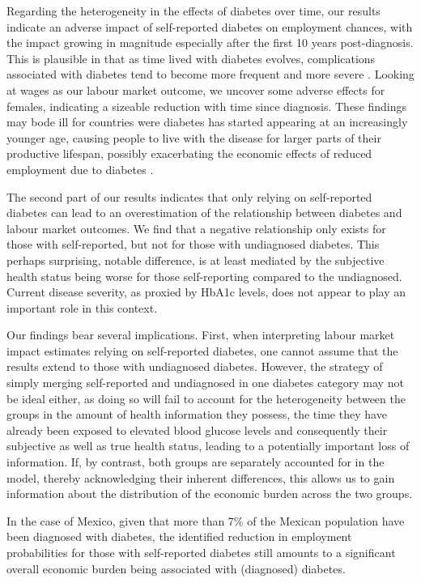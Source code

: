 Regarding the heterogeneity in the effects of diabetes over time, our results indicate an adverse impact of self-reported diabetes on employment chances, with the impact growing in magnitude especially after the first 10 years post-diagnosis. This is plausible in that as time lived with diabetes evolves, complications associated with diabetes tend to become more frequent and more severe \parencite{Adler2003}. Looking at wages as our labour market outcome, we uncover some adverse effects for females, indicating a sizeable reduction with time since diagnosis. These findings may bode ill for countries were diabetes has started appearing at an increasingly younger age, causing people to live with the disease for larger parts of their productive lifespan, possibly exacerbating the economic effects of reduced employment due to diabetes \parencite{Hu2011,Villalpando2010}.

The second part of our results indicates that only relying on self-reported diabetes can lead to an overestimation of the relationship between diabetes and labour market outcomes. We find that a negative relationship only exists for those with self-reported, but not for those with undiagnosed diabetes. This perhaps surprising, notable difference, is at least mediated by the subjective health status being worse for those self-reporting compared to the undiagnosed. Current disease severity, as proxied by \ac{HbA1c} levels, does not appear to play an important role in this context.

Our findings bear several implications. First, when interpreting labour market impact estimates relying on self-reported diabetes, one cannot assume that the results extend to those with undiagnosed diabetes. However, the strategy of simply merging self-reported and undiagnosed in one diabetes category may not be ideal either, as doing so will fail to account for the heterogeneity between the groups in the amount of health information they possess, the time they have already been exposed to elevated blood glucose levels and consequently their subjective as well as true health status, leading to a potentially important loss of information. If, by contrast, both groups are separately accounted for in the model, thereby acknowledging their inherent differences, this allows us to gain information about the distribution of the economic burden across the two groups. 

In the case of Mexico, given that more than 7\% of the Mexican population have been diagnosed with diabetes, the identified reduction in employment probabilities for those with self-reported diabetes still amounts to a significant overall economic burden being associated with (diagnosed) diabetes.

